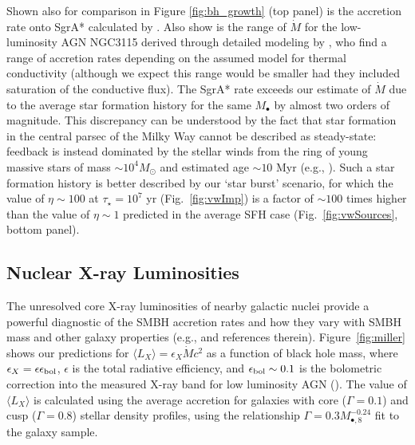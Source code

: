 \documentclass[usenatbib,fleqn]{mn2e}
\newcommand{\Mbheight}{M_{\bullet,8}}
\begin{document}
Shown also for comparison in Figure \ref{fig:bh_growth} (top panel) is
the accretion rate onto SgrA* calculated by \citet{Quataert:2004a}.
Also show is the range of $\dot{M}$ for the low-luminosity AGN NGC3115
derived through detailed modeling by \citealt{ShcherbakovWong+:2014a},
who find a range of accretion rates depending on the assumed model for
thermal conductivity (although we expect this range would be smaller
had they included saturation of the conductive flux).  The SgrA* rate
exceeds our estimate of $\dot{M}$ due to the average star formation
history for the same $M_{\bullet}$ by almost two orders of magnitude.
This discrepancy can be understood by the fact that star formation in
the central parsec of the Milky Way cannot be described as
steady-state: feedback is instead dominated by the stellar winds from
the ring of young massive stars of mass $\sim 10^{4}M_{\odot}$ and
estimated age $\sim 10$ Myr (e.g., \citealt{Schodel+07}).  Such a star
formation history is better described by our `star burst' scenario,
for which the value of $\eta \sim 100$ at $\tau_{\star} = 10^{7}$ yr
(Fig.~\ref{fig:vwImp}) is a factor of $\sim 100$ times higher than the
value of $\eta \sim 1$ predicted in the average SFH case
(Fig.~\ref{fig:vwSources}, bottom panel).


\subsection{Nuclear X-ray Luminosities}
\label{sec:Lx}

The unresolved core X-ray luminosities of nearby galactic nuclei provide a
powerful diagnostic of the SMBH accretion rates and how they vary with
SMBH mass and other galaxy properties (e.g., \citealt{Ho08} and
references therein).  Figure~\ref{fig:miller} shows our predictions
for $\langle L_{X} \rangle =\epsilon_X \dot{M} c^2$ as a function of
black hole mass, where $\epsilon_{X} = \epsilon\epsilon_{\rm bol}$,
$\epsilon$ is the total radiative efficiency, and $\epsilon_{\rm bol}
\sim 0.1$ is the bolometric correction into the measured X-ray band
for low luminosity AGN (\citealt{Ho08}).  The value of $\langle L_X
\rangle$ is calculated using the average accretion for galaxies with
core ($\Gamma = 0.1$) and cusp ($\Gamma = 0.8$) stellar density
profiles, using the relationship $\Gamma = 0.3 \Mbheight^{-0.24}$ fit
to the \citet{LauerFaber+:2007a} galaxy sample.
\end{document}
